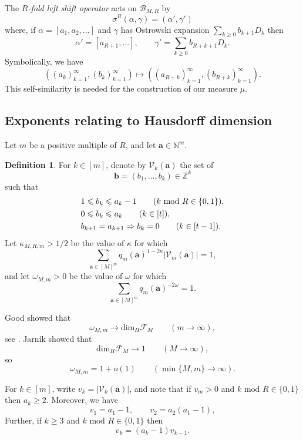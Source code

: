 \documentclass[12pt, reqno]{amsart}
\theoremstyle{definition}
\newtheorem{defn}[thm]{Definition}
\theoremstyle{remark}
\numberwithin{equation}{section}
\newcommand{\mmod}[1]{\,\,\mathrm{mod}\,\,#1}
\def\alp{{\alpha}} \def\bfalp{{\boldsymbol \alpha}}
\def\gam{{\gamma}} \def\Gam{{\Gamma}}
\def\kap{{\kappa}}
\def\sig{{\sigma}} \def\Sig{{\Sigma}} \def\bfsig{{\boldsymbol \sig}}
\def\ome{{\omega}} \def\Ome{{\Omega}} \def\bfome{{\boldsymbol \ome}}
\def\implies{\Rightarrow}
\def\le{\leqslant} \def\ge{\geqslant}
\def \sig{{\sigma}}
\def \bN {\mathbb N}
\def \bZ {\mathbb Z}
\def \ba {\mathbf a}
\def \bb {\mathbf b}
\def \cB {\mathcal B}
\def \cF {\mathcal F}
\def \cV {\mathcal V}
\def \dim {\mathrm{dim}}
\begin{document}
The \emph{$R$-fold left shift operator} acts on $\cB_{M,R}$ by
\[
\sig^R(\alp, \gam)
= (\alp', \gam')
\]
where, if
$
\alp = [a_1,a_2,\ldots]
$
and $\gam$ has Ostrowski expansion $\displaystyle \sum_{k \ge 0} b_{k+1} D_k$ then
\[
\alp' = [a_{R+1},\ldots],
\qquad
\gam' = \sum_{k \ge 0} 
b_{R+k+1} D_k.
\]
Symbolically, we have
\[
((a_k)_{k=1}^\infty,
(b_k)_{k=1}^\infty)
\mapsto
((a_{R+k})_{k=1}^\infty,
(b_{R+k})_{k=1}^\infty).
\]
This self-similarity is needed for the construction of our measure $\mu$.

\subsection{Exponents relating to Hausdorff dimension} \label{subsection_HD}

Let $m$ be a positive multiple of $R$, and let $\ba \in \bN^m$. 

\begin{defn} \label{Vdef}
For $k \in [m]$, denote by $\cV_k(\ba)$ the set of 
\[
\bb = (b_1,\ldots,b_k) \in \bZ^k
\]
such that
\begin{align} 
&1 \le b_k \le a_k - 1 \qquad 
(k \mmod R \in \{0,1\}),
\notag \\
&0 \le b_k \le a_k \qquad (k \in [t]), \notag
\\ &b_{k+1} = a_{k+1} \implies b_k = 0 \qquad (k \in [t-1]).\notag
\end{align}
Let $\kap_{M,R,m} > 1/2$ be the value of $\kap$ for which
\begin{equation} 
\label{def_kappa_MRm}
\sum_{\ba \in [M]^m} q_m(\ba)^{1-2 \kap} |\cV_m(\ba)| = 1,
\end{equation}
and let $\ome_{M,m} > 0$ be the value of $\ome$ for which
\[
\sum_{\ba \in [M]^m} 
q_m(\ba)^{-2 \ome} = 1.
\]
\end{defn}
Good \cite{Good} showed that
\[
\ome_{M,m} \to \dim_H \cF_M 
\qquad (m \to \infty),
\]
see \cite[Theorem 3.1]{QR2003}. Jarn\'ik \cite{Jar1928} showed that
\[
\dim_H \cF_M \to 1 
\qquad (M \to \infty),
\]
so
\begin{equation} \label{GoodJarnik}
\ome_{M,m} = 1 + o(1) 
\qquad (\min \{ M, m \} \to \infty).
\end{equation}

For $k \in [m]$, write $v_k = |\cV_k(\ba)|$, and note that if $v_m > 0$ and $k \mmod R \in \{0,1\}$ then $a_k \ge 2$. Moreover, we have
\[
v_1 = a_1 - 1, \qquad v_2 = a_2(a_1 - 1),
\]
Further, if $k \ge 3$ and $k \mmod R \in \{0,1\}$ then
\[
v_k = (a_k - 1)v_{k-1}.
\]
\end{document}

